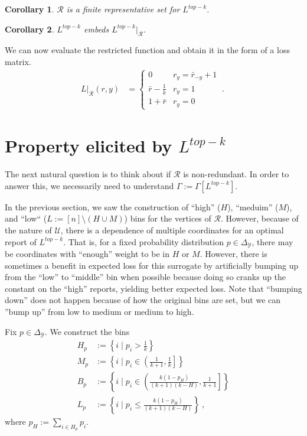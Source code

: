 \documentclass[12pt]{article}
\newcommand{\prop}[1]{\Gamma[#1]}
\newcommand{\simplex}{\Delta_\Y}
\newcommand{\R}{\mathcal{R}}
\newcommand{\U}{\mathcal{U}}
\newcommand{\Y}{\mathcal{Y}}
\newtheorem{corollary}{Corollary}
\begin{document}
\begin{corollary}
	$\R$ is a finite representative set for $L^{top-k}$.
\end{corollary}

\begin{corollary}
	$L^{top-k}$ embeds $L^{top-k}|_\R$.
\end{corollary}

We can now evaluate the restricted function and obtain it in the form of a loss matrix.
\begin{align}
L|_{\R}(r,y) &= \begin{cases}
0 & r_y = \bar r_{-y} + 1\\
\bar r - \frac 1 k & r_y = 1\\
1 + \bar r & r_y = 0
\end{cases}~.~
\end{align}


\section{Property elicited by $L^{top-k}$}
The next natural question is to think about if $\R$ is non-redundant.
In order to answer this, we necessarily need to understand $\Gamma := \prop{L^{top-k}}$.

In the previous section, we saw the construction of ``high'' ($H$), ``meduim'' ($M$), and ``low`` ($L := [n] \setminus (H \cup M)$) bins for the vertices of $\R$.
However, because of the nature of $\U$, there is a dependence of multiple coordinates for an optimal report of $L^{top-k}$.
That is, for a fixed probability distribution $p \in \simplex$, there may be coordinates with ``enough'' weight to be in $H$ or $M$.
However, there is sometimes a benefit in expected loss for this surrogate by artificially bumping up from the ``low'' to ``middle'' bin when possible because doing so cranks up the constant on the ``high'' reports, yielding better expected loss.
Note that ``bumping down'' does not happen because of how the original bins are set, but we can ''bump up'' from low to medium or medium to high.

Fix $p \in \simplex$.
We construct the bins
\begin{align*}
H_p &:= \left\{i \mid p_i > \frac 1 k\right\}\\
M_p &:= \left\{i \mid p_i \in \left(\frac 1 {k+1}, \frac 1 k\right]\right\} \\
B_p &:= \left\{i \mid p_i \in \left(\frac {k(1-p_H)}{(k+1)(k-H)}, \frac 1 {k+1} \right]\right\}\\
L_p &:= \left\{i \mid p_i \leq \frac {k(1-p_H)}{(k+1)(k-H)} \right\}~,~
\end{align*}
where $p_H := \sum_{i \in H_p} p_i$.
\end{document}
